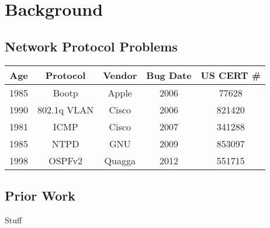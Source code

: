 \section{Background}

\subsection{Network Protocol Problems }

\begin{tabular}{|c|c|c|c|c|}
   \hline
   Age & Protocol & Vendor & Bug Date & US CERT \# \\ \hline
   \hline
   1985 & Bootp & Apple & 2006 & 77628 \\ \hline
   1990 & 802.1q VLAN & Cisco & 2006 & 821420 \\ \hline
   1981 & ICMP & Cisco & 2007 & 341288 \\ \hline
   1985 & NTPD & GNU & 2009 & 853097 \\ \hline
   1998 & OSPFv2 & Quagga & 2012 & 551715 \\ \hline
\end{tabular}

\subsection{Prior Work}

Stuff \cite{packet_types}
